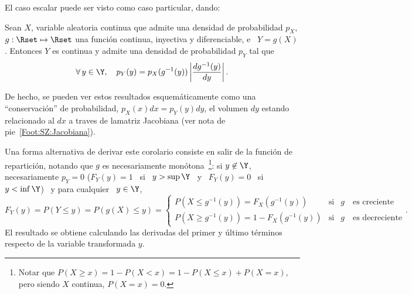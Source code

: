 El caso escalar puede ser visto como caso particular, dando:
%
\begin{corolario}
\label{Cor:MP:TransformacionInyectivaDensidadEscalar}
%
  Sean $X$, variable aleatoria continua  que admite una densidad de probabilidad
  $p_X$,   $g:\Rset  \mapsto   \Rset$  una   funci\'on  continua,   inyectiva  y
  diferenciable, e \ $Y = g(X)$.  Entonces $Y$ es continua y admite una densidad
  de probabilidad $p_Y$ tal que
  \[
  \forall  \,   y  \in  \Y,   \quad  p_Y(y)  =  p_X(g^{-1}(y))   \left|  \frac{d
      g^{-1}(y)}{dy} \right|.
  \]
\end{corolario}
%
\noindent De hecho,  se pueden ver estos resultados  esquem\'aticamente como una
``conservaci\'on'' de  probabilidad, $p_X(x)  dx = p_Y(y)  dy$, el  volumen $dy$
estando  relacionado  al  $dx$ a  traves  de  lamatriz  Jacobiana (ver  nota  de
pie~\ref{Foot:SZ:Jacobiana}).

Una  forma  alternativa  de derivar  este  corolario  consiste  en salir  de  la
funci\'on    de    repartici\'on,   notando    que    $g$   es    necesariamente
mon\'otona~\footnote{Notar que $P(X \ge x) = 1 - P(X < x) = 1 - P(X \le x) + P(X
  =  x)$, pero  siendo $X$  continua, $  P(X =  x) =  0$.}: si  $y  \not\in \Y$,
necesariamente $p_Y = 0$ ($F_Y(y) = 1$ \ si \ $y > \sup \Y$ \ y \ $F_Y(y) = 0$ \
si \ $y < \inf \Y$) \ y para cualquier \ $y \in \Y$,
%
\[
F_Y(y) = P(Y \le y) = P(g(X) \le y) =
\left\{\begin{array}{lll}
P(X \le g^{-1}(y)) = F_X(g^{-1}(y)) & \mbox{si} & g \quad \mbox{es creciente}\\[2.5mm]
%
P(X \ge g^{-1}(y)) = 1 - F_X(g^{-1}(y)) & \mbox{si} & g \quad \mbox{es decreciente}
\end{array}\right..
\]
%
El  resultado  se  obtiene  calculando  las  derivadas  del  primer  y  \'ultimo
t\'erminos respecto de la variable transformada $y$.


